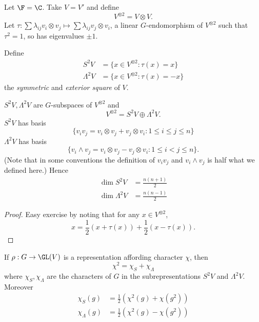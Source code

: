\documentclass[a4paper]{article}
\theoremstyle{definition}
\begin{document}
Let \(\F = \C\). Take \(V = V'\) and define
\[
  V^{\otimes 2} = V \otimes V.
\]
Let \(\tau: \sum \lambda_{ij} v_i \otimes v_j \mapsto \sum \lambda_{ij} v_j \otimes v_i\), a linear \(G\)-endomorphism of \(V^{\otimes 2}\) such that \(\tau^2 = 1\), so has eigenvalues \(\pm 1\).

\begin{definition}
  Define
  \begin{align*}
    S^2V &= \{x \in V^{\otimes 2}: \tau(x) = x\} \\
    \Lambda^2 V &= \{x \in V^{\otimes 2}: \tau(x) = -x\}
  \end{align*}
  the \emph{symmetric} and \emph{exterior square} of \(V\).
\end{definition}

\begin{lemma}
  \(S^2V, \Lambda^2 V\) are \(G\)-subspaces of \(V^{\otimes 2}\) and
  \[
    V^{\otimes 2} = S^2 V \oplus \Lambda^2V.
  \]
  \(S^2V\) has basis
  \[
    \{v_iv_j = v_i \otimes v_j + v_j \otimes v_i: 1 \leq i \leq j \leq n\}
  \]
  \(\Lambda^2V\) has basis
  \[
    \{v_i \wedge v_j = v_i \otimes v_j - v_j \otimes v_i: 1 \leq i < j \leq n\}.
  \]
  (Note that in some conventions the definition of \(v_iv_j\) and \(v_i \wedge v_j\) is half what we defined here.) Hence
  \begin{align*}
    \dim S^2 V &= \frac{n (n + 1)}{2} \\
    \dim \Lambda^2 V &= \frac{n (n - 1)}{2}
  \end{align*}
\end{lemma}

\begin{proof}
  Easy exercise by noting that for any \(x \in V^{\otimes 2}\),
  \[
    x = \frac{1}{2} (x + \tau(x)) + \frac{1}{2} (x - \tau(x)).
  \]
\end{proof}

\begin{lemma}
  If \(\rho: G \to \GL(V)\) is a representation affording character \(\chi\), then
  \[
    \chi^2 = \chi_S + \chi_\Lambda
  \]
  where \(\chi_S, \chi_\Lambda\) are the characters of \(G\) in the subrepresentations \(S^2V\) and \(\Lambda^2V\). Moreover
  \begin{align*}
    \chi_S(g) &= \frac{1}{2} (\chi^2(g) + \chi(g^2)) \\
    \chi_\Lambda(g) &= \frac{1}{2} (\chi^2(g) - \chi(g^2))
  \end{align*}
\end{lemma}
\end{document}
